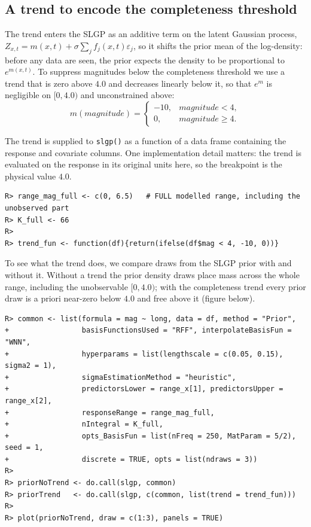 \documentclass[
]{article}
\begin{document}
\subsection{A trend to encode the completeness threshold}\label{a-trend-to-encode-the-completeness-threshold}

The trend enters the SLGP as an additive term on the latent Gaussian process, \(Z_{x,t} = m(x, t) + \sigma \sum_j f_j(x,t)\varepsilon_j\), so it shifts the prior mean of the log-density: before any data are seen, the prior expects the density to be proportional to \(e^{m(x,t)}\). To suppress magnitudes below the
completeness threshold we use a trend that is zero above \(4.0\) and decreases linearly below it, so that \(e^{m}\) is negligible on \([0, 4.0)\) and unconstrained above:
\[
m(magnitude)=
\begin{cases}
-10, & magnitude < 4,\\
0, & magnitude \geq 4.
\end{cases}
\]

The trend is supplied to \texttt{slgp()} as a function of a data frame containing the response and covariate columns. One implementation detail matters: the trend is evaluated on the response in its original units here, so the breakpoint is the physical value \(4.0\).

\begin{verbatim}
R> range_mag_full <- c(0, 6.5)   # FULL modelled range, including the unobserved part
R> K_full <- 66                  
R> 
R> trend_fun <- function(df){return(ifelse(df$mag < 4, -10, 0))}
\end{verbatim}

To see what the trend does, we compare draws from the SLGP prior with and without
it. Without a trend the prior density draws place mass across the whole range,
including the unobservable \([0, 4.0)\); with the completeness trend every prior
draw is a priori near-zero below \(4.0\) and free above it (figure below).

\begin{verbatim}
R> common <- list(formula = mag ~ long, data = df, method = "Prior",
+                 basisFunctionsUsed = "RFF", interpolateBasisFun = "WNN",
+                 hyperparams = list(lengthscale = c(0.05, 0.15), sigma2 = 1),
+                 sigmaEstimationMethod = "heuristic",
+                 predictorsLower = range_x[1], predictorsUpper = range_x[2],
+                 responseRange = range_mag_full, 
+                 nIntegral = K_full,
+                 opts_BasisFun = list(nFreq = 250, MatParam = 5/2), seed = 1,
+                 discrete = TRUE, opts = list(ndraws = 3))
R> 
R> priorNoTrend <- do.call(slgp, common)
R> priorTrend   <- do.call(slgp, c(common, list(trend = trend_fun)))
R> 
R> plot(priorNoTrend, draw = c(1:3), panels = TRUE)
\end{verbatim}
\end{document}
